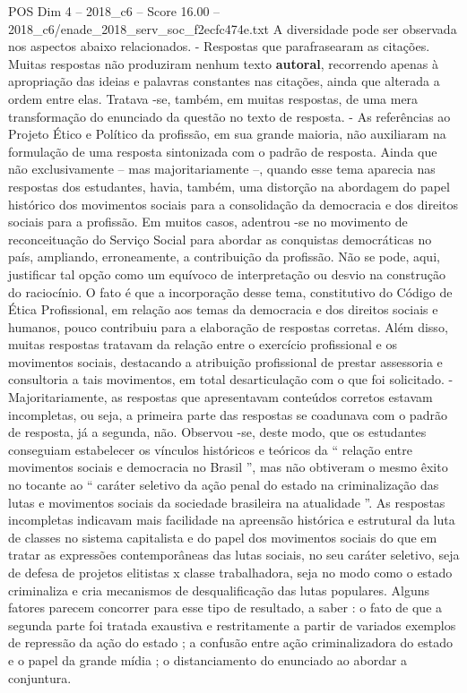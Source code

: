 \begin{textsample}{POS Dim 4 – 2018\_c6 – Score 16.00 – 2018\_c6/enade\_2018\_serv\_soc\_f2ecfc474e.txt}
A diversidade pode ser observada nos aspectos abaixo relacionados. - Respostas que parafrasearam as citações.
Muitas respostas não produziram nenhum texto \textbf{autoral}, recorrendo apenas à apropriação das ideias e palavras constantes nas citações, ainda que alterada a ordem entre elas.
Tratava -se, também, em muitas respostas, de uma mera transformação do enunciado da questão no texto de resposta. - As referências ao Projeto Ético e Político da profissão, em sua grande maioria, não auxiliaram na formulação de uma resposta sintonizada com o padrão de resposta.
Ainda que não exclusivamente – mas majoritariamente –, quando esse tema aparecia nas respostas dos estudantes, havia, também, uma distorção na abordagem do papel histórico dos movimentos sociais para a consolidação da democracia e dos direitos sociais para a profissão.
Em muitos casos, adentrou -se no movimento de reconceituação do Serviço Social para abordar as conquistas democráticas no país, ampliando, erroneamente, a contribuição da profissão.
Não se pode, aqui, justificar tal opção como um equívoco de interpretação ou desvio na construção do raciocínio.
O fato é que a incorporação desse tema, constitutivo do Código de Ética Profissional, em relação aos temas da democracia e dos direitos sociais e humanos, pouco contribuiu para a elaboração de respostas corretas.
Além disso, muitas respostas tratavam da relação entre o exercício profissional e os movimentos sociais, destacando a atribuição profissional de prestar assessoria e consultoria a tais movimentos, em total desarticulação com o que foi solicitado. - Majoritariamente, as respostas que apresentavam conteúdos corretos estavam incompletas, ou seja, a primeira parte das respostas se coadunava com o padrão de resposta, já a segunda, não.
Observou -se, deste modo, que os estudantes conseguiam estabelecer os vínculos históricos e teóricos da “ relação entre movimentos sociais e democracia no Brasil ”, mas não obtiveram o mesmo êxito no tocante ao “ caráter seletivo da ação penal do estado na criminalização das lutas e movimentos sociais da sociedade brasileira na atualidade ”.
As respostas incompletas indicavam mais facilidade na apreensão histórica e estrutural da luta de classes no sistema capitalista e do papel dos movimentos sociais do que em tratar as expressões contemporâneas das lutas sociais, no seu caráter seletivo, seja de defesa de projetos elitistas x classe trabalhadora, seja no modo como o estado criminaliza e cria mecanismos de desqualificação das lutas populares.
Alguns fatores parecem concorrer para esse tipo de resultado, a saber : o fato de que a segunda parte foi tratada exaustiva e restritamente a partir de variados exemplos de repressão da ação do estado ; a confusão entre ação criminalizadora do estado e o papel da grande mídia ; o distanciamento do enunciado ao abordar a conjuntura.

\end{textsample}
